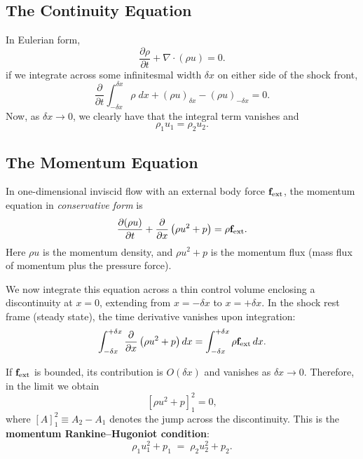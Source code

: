 \subsection*{The Continuity Equation}

In Eulerian form,
\[
\frac{\partial \rho}{\partial t} + \nabla \cdot (\rho u) = 0.
\]
if we integrate across some infinitesmal width $\delta x$ on either side of the shock front,
\[
\frac{\partial}{\partial t} \int_{-\delta x}^{\delta x} \rho \;dx + (\rho u)_{\delta x} - (\rho u)_{-\delta x} =0.
\]
Now, as $\delta x \to 0$, we clearly have that the integral term vanishes and
\[
\boxed{\rho_1u_1 = \rho_2u_2}.
\]

\subsection*{The Momentum Equation}

In one-dimensional inviscid flow with an external body force ${\bf f}_{\rm ext}$, the momentum equation in \emph{conservative form} is
\begin{equation}
\frac{\partial (\rho u)}{\partial t} 
+ \frac{\partial}{\partial x} \left( \rho u^2 + p \right)
= \rho {\bf f}_{\rm ext}.
\end{equation}
Here $\rho u$ is the momentum density, and $\rho u^2 + p$ is the momentum flux (mass flux of momentum plus the pressure force).

\medskip

We now integrate this equation across a thin control volume enclosing a discontinuity at $x = 0$, extending from $x = -\delta x$ to $x = +\delta x$. In the shock rest frame (steady state), the time derivative vanishes upon integration:
\begin{equation}
\int_{-\delta x}^{+\delta x} 
\frac{\partial}{\partial x} \left( \rho u^2 + p \right) dx
= \int_{-\delta x}^{+\delta x} \rho {\bf f}_{\rm ext} \, dx.
\end{equation}

If ${\bf f}_{\rm ext}$ is bounded, its contribution is $O(\delta x)$ and vanishes as $\delta x \to 0$. Therefore, in the limit we obtain
\begin{equation}
\left[ \rho u^2 + p \right]_{1}^{2} = 0,
\end{equation}
where $[A]_1^2 \equiv A_2 - A_1$ denotes the jump across the discontinuity. This is the \textbf{momentum Rankine–Hugoniot condition}:
\begin{equation}
\boxed{
\rho_1 u_1^2 + p_1 \;=\; \rho_2 u_2^2 + p_2.}
\end{equation}
